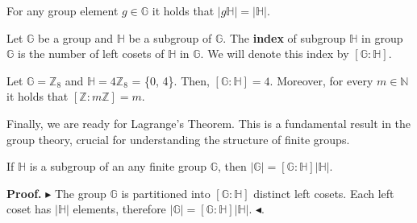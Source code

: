 \documentclass[../lecture-notes-148x210.tex]{subfiles}
\begin{document}
\begin{lemma}
    For any group element $g \in \mathbb{G}$ it holds that $\left| g\mathbb{H} \right| = \left| \mathbb{H} \right|$.
\end{lemma}

\begin{definition}
    Let $\mathbb{G}$ be a group and $\mathbb{H}$ be a subgroup of $\mathbb{G}$.
    The \textbf{index} of subgroup $\mathbb{H}$ in group $\mathbb{G}$ is the
    number of left cosets of $\mathbb{H}$ in $\mathbb{G}$. We will denote this
    index by $\left[ \mathbb{G} : \mathbb{H} \right]$.
\end{definition}

\begin{example}
    Let $\mathbb{G} = \mathbb{Z}_{8}$ and $\mathbb{H} = 4\mathbb{Z}_{8}$ = \{0,
    4\}. Then, $\left[ \mathbb{G} : \mathbb{H} \right] = 4$. Moreover, for every
    $m \in \mathbb{N}$ it holds that $\left[ \mathbb{Z} : m \mathbb{Z} \right] =
    m$.
\end{example}


Finally, we are ready for Lagrange's Theorem. This is a fundamental result in the group
 theory, crucial for understanding the structure of finite groups.

\begin{theorem} [Lagrange]
    If $\mathbb{H}$ is a subgroup of an any finite group $\mathbb{G}$, 
    then $\left| \mathbb{G} \right| = \left[ \mathbb{G} : \mathbb{H} \right] \left| \mathbb{H} \right|$.
\end{theorem}

\textbf{Proof.} 
$\blacktriangleright$ 
The group $\mathbb{G}$ is partitioned into $\left[ \mathbb{G} : \mathbb{H} \right]$ distinct left cosets.
Each left coset has $\left| \mathbb{H} \right|$ elements, therefore 
$\left|\mathbb{G}\right| = \left[ \mathbb{G} : \mathbb{H} \right] \left| \mathbb{H} \right|$.
$\blacktriangleleft$.
\end{document}
